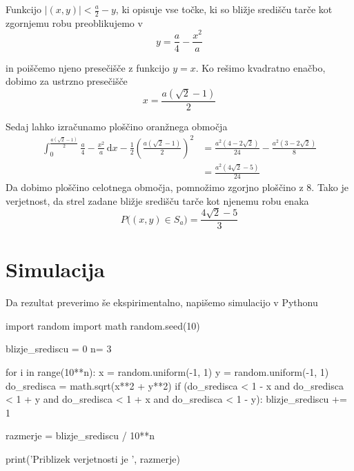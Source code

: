\documentclass{amsart}
\theoremstyle{definition} %
\theoremstyle{plain} %
\begin{document}
Funkcijo $|(x,y)| < \frac{a}{2} - y$, ki opisuje vse točke, ki so bližje središču tarče kot
zgornjemu robu preoblikujemo v 
\begin{equation*}
    y = \frac{a}{4} - \frac{x^2}{a}
\end{equation*}

in poiščemo njeno presečišče z funkcijo $y = x$. Ko rešimo kvadratno enačbo,
dobimo za ustrzno presečišče
\begin{equation*}
    x=\frac{a(\sqrt{2}-1)}{2}
\end{equation*}

Sedaj lahko izračunamo ploščino oranžnega območja
\begin{align*}
    \int_{0}^{\frac{a(\sqrt{2}-1)}{2}} \frac{a}{4} - \frac{x^2}{a} \, \mathrm{d}x - \frac{1}{2}(\frac{a(\sqrt{2}-1)}{2})^2
    &= \frac{a^2(4-2\sqrt{2})}{24} - \frac{a^2(3-2\sqrt{2})}{8} \\
    &= \frac{a^2(4\sqrt{2}-5)}{24}
\end{align*}
Da dobimo ploščino celotnega območja, pomnožimo zgorjno ploščino z $8$. Tako je verjetnost, da strel zadane bližje središču
tarče kot njenemu robu enaka
\begin{equation*}
    P\big((x,y) \in S_a\big) = \frac{4\sqrt{2}-5}{3}
\end{equation*}

\pagebreak

\section{Simulacija}

Da rezultat preverimo še ekspirimentalno, napišemo simulacijo v Pythonu

\begin{python}
    import random
    import math
    random.seed(10)
    
    blizje_srediscu = 0
    n= 3
    
    for i in range(10**n):
        x = random.uniform(-1, 1)
        y = random.uniform(-1, 1)
        do_sredisca = math.sqrt(x**2 + y**2)
        if (do_sredisca < 1 - x and do_sredisca < 1 + y and
            do_sredisca < 1 + x  and do_sredisca < 1 - y):
            blizje_srediscu += 1
    
        razmerje = blizje_srediscu / 10**n
    
    print('Priblizek verjetnosti je ', razmerje)
\end{python}
\end{document}
